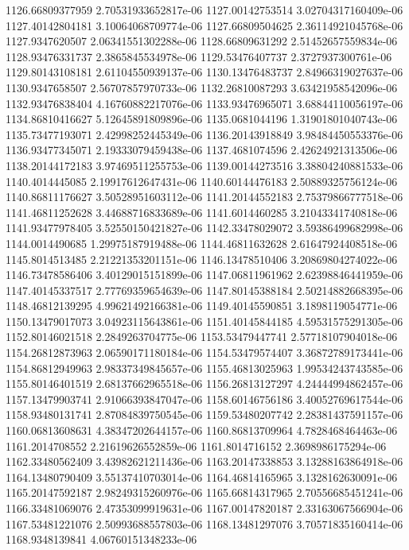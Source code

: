 {1126.66809377959 2.70531933652817e-06
1127.00142753514 3.02704317160409e-06
1127.40142804181 3.10064068709774e-06
1127.66809504625 2.36114921045768e-06
1127.9347620507 2.06341551302288e-06
1128.66809631292 2.51452657559834e-06
1128.93476331737 2.3865845534978e-06
1129.53476407737 2.3727937300761e-06
1129.80143108181 2.61104550939137e-06
1130.13476483737 2.84966319027637e-06
1130.9347658507 2.56707857970733e-06
1132.26810087293 3.63421958542096e-06
1132.93476838404 4.16760882217076e-06
1133.93476965071 3.68844110056197e-06
1134.86810416627 5.12645891809896e-06
1135.0681044196 1.31901801040743e-06
1135.73477193071 2.42998252445349e-06
1136.20143918849 3.98484450553376e-06
1136.93477345071 2.19333079459438e-06
1137.4681074596 2.42624921313506e-06
1138.20144172183 3.97469511255753e-06
1139.00144273516 3.38804240881533e-06
1140.4014445085 2.19917612647431e-06
1140.60144476183 2.50889325756124e-06
1140.86811176627 3.50528951603112e-06
1141.20144552183 2.75379866777518e-06
1141.46811252628 3.44688716833689e-06
1141.6014460285 3.21043341740818e-06
1141.93477978405 3.52550150421827e-06
1142.33478029072 3.59386499682998e-06
1144.0014490685 1.29975187919488e-06
1144.46811632628 2.61647924408518e-06
1145.8014513485 2.21221353201151e-06
1146.13478510406 3.20869804274022e-06
1146.73478586406 3.40129015151899e-06
1147.06811961962 2.62398846441959e-06
1147.40145337517 2.77769359654639e-06
1147.80145388184 2.50214882668395e-06
1148.46812139295 4.99621492166381e-06
1149.40145590851 3.1898119054771e-06
1150.13479017073 3.04923115643861e-06
1151.40145844185 4.59531575291305e-06
1152.80146021518 2.2849263704775e-06
1153.53479447741 2.57718107904018e-06
1154.26812873963 2.06590171180184e-06
1154.53479574407 3.36872789173441e-06
1154.86812949963 2.98337349845657e-06
1155.46813025963 1.99534243743585e-06
1155.80146401519 2.68137662965518e-06
1156.26813127297 4.24444994862457e-06
1157.13479903741 2.91066393847047e-06
1158.60146756186 3.40052769617544e-06
1158.93480131741 2.87084839750545e-06
1159.53480207742 2.28381437591157e-06
1160.06813608631 4.38347202644157e-06
1160.86813709964 4.7828468464463e-06
1161.2014708552 2.21619626552859e-06
1161.8014716152 2.3698986175294e-06
1162.33480562409 3.43982621211436e-06
1163.20147338853 3.13288163864918e-06
1164.13480790409 3.55137410703014e-06
1164.46814165965 3.1328162630091e-06
1165.20147592187 2.98249315260976e-06
1165.66814317965 2.70556685451241e-06
1166.33481069076 2.47353099919631e-06
1167.00147820187 2.33163067566904e-06
1167.53481221076 2.50993688557803e-06
1168.13481297076 3.70571835160414e-06
1168.9348139841 4.06760151348233e-06
}
